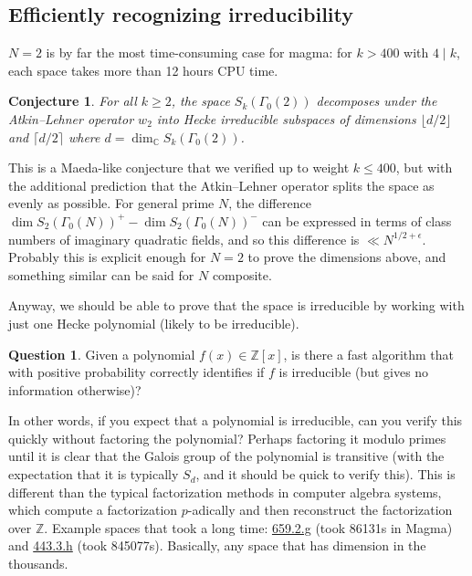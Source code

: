 \documentclass[11pt]{amsart}
\numberwithin{equation}{subsection}
\theoremstyle{plain}
\newtheorem{conj}[equation]{Conjecture}
\theoremstyle{definition}
\newtheorem{ques}[equation]{Question}
\newcommand{\Z}{\mathbb{Z}}
\newcommand{\C}{\mathbb{C}}
\begin{document}
\subsection{Efficiently recognizing irreducibility}

$N=2$ is by far the most time-consuming case for magma: for $k>400$ with $4 \mid k$, each space takes more than 12 hours CPU time.  

\begin{conj}
For all $k \geq 2$, the space $S_k(\Gamma_0(2))$ decomposes under the Atkin--Lehner operator $w_2$ into Hecke irreducible subspaces of dimensions $\lfloor d/2\rfloor$ and $\lceil d/2 \rceil$ where $d=\dim_\C S_k(\Gamma_0(2))$.
\end{conj}

This is a Maeda-like conjecture that we verified up to weight $k \leq 400$, but with the additional prediction that the Atkin--Lehner operator splits the space as evenly as possible.  For general prime $N$, the difference $\dim S_2(\Gamma_0(N))^+ - \dim S_2(\Gamma_0(N))^-$ can be expressed in terms of class numbers of imaginary quadratic fields, and so this difference is $\ll N^{1/2+\epsilon}$.  Probably this is explicit enough for $N=2$ to prove the dimensions above, and something similar can be said for $N$ composite.  

Anyway, we should be able to prove that the space is irreducible by working with just one Hecke polynomial (likely to be irreducible).

\begin{ques}
Given a polynomial $f(x) \in \Z[x]$, is there a fast algorithm that with positive probability correctly identifies if $f$ is irreducible (but gives no information otherwise)?
\end{ques}

In other words, if you expect that a polynomial is irreducible, can you verify this quickly without factoring the polynomial?  Perhaps factoring it modulo primes until it is clear that the Galois group of the polynomial is transitive (with the expectation that it is typically $S_d$, and it should be quick to verify this).  This is different than the typical factorization methods in computer algebra systems, which compute a factorization $p$-adically and then reconstruct the factorization over $\Z$.  Example spaces that took a long time: \href{http://cmfskatex.lmfdb.xyz/ModularForm/GL2/Q/holomorphic/659/2/g/}{\textsf{659.2.g}} (took 86131s in Magma) and 
\href{http://cmfskatex.lmfdb.xyz/ModularForm/GL2/Q/holomorphic/443/3/h/}{\textsf{443.3.h}} (took 845077s).  Basically, any space that has dimension in the thousands.
\end{document}
